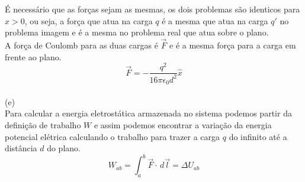 \documentclass[a4paper,11pt]{exam}
\begin{document}
{\begin{center}
	\end{center}
	
	\indent É necessário que as forças sejam as mesmas, os dois problemas são identicos para $x>0$, ou seja, a força que atua na carga $q$ é a mesma que atua na carga $q'$ no problema imagem e é a mesma no problema real que atua sobre o plano.\\
	\indent A força de Coulomb para as duas cargas é $\vec{F}$ e é a mesma força para a carga em frente ao plano.
	\[\vec{F} = -\frac{q^2}{16 \pi \epsilon_0 d^2} \hat{x}\]
	\\
	(e)
	\\
	Para calcular a energia eletrostática armazenada no sistema podemos partir da definição de trabalho $W$ e assim podemos encontrar a variação da energia potencial elétrica calculando o trabalho para trazer a carga $q$ do infinito até a distância $d$ do plano.
	\[ W_{ab} = \int_a^b \vec{F} \cdot \, d\vec{l} = \Delta U_{ab}  \]
	
}
\end{document}
